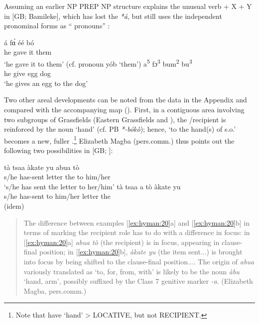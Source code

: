 \documentclass[output=paper]{langsci/langscibook}
\begin{document}
\noindent
Assuming an earlier NP PREP NP structure explains the unusual verb + X + Y  in  [GB; Bamileke], which has lost the  \textit{*á}, but still uses the independent pronominal forms as “ pronouns” \citep[22]{Voorhoeve1976}:

\ea
\label{ex:hyman:19}
\ea 
\gll á  {\downstep}f\'ɑ  é{\downstep}é  bó \\
he gave it them\\
\glt ‘he gave it to them’  (cf.  pronoun yób ‘them’)
\ex 
\gll  a\textsuperscript{5}  fɔ\textsuperscript{3}  bum\textsuperscript{2}  bu\textsuperscript{3}\\
he give  egg    dog\\
\glt ‘he gives an egg to the dog’  \citep[2]{Caroompas2014}
\z 
\z 

Two other areal developments can be noted from the data in the Appendix and compared with the accompanying map (). First, in a contiguous area involving two subgroups of Grassfields  (Eastern Grassfields and ), the /recipient  is reinforced by the noun ‘hand’ (cf. PB \textit{*-bókò}); hence, ‘to the hand(s) of s.o.’ becomes a new, fuller .\footnote{Note that \citet[166]{Heine2002} have ‘hand’ {\textgreater} LOCATIVE, but not RECIPIENT.} Elizabeth Magba (pers.comm.) thus points out the following two possibilities in  [GB; ]:
  
\ea
    \label{ex:hyman:20}
\ea 
\gll tà    tsaa   àkate  yu  abua  tò\\
s/he has-sent letter   the    to   him/her \\
\glt ‘s/he has sent the letter to her/him’ 
\ex 
\gll tà    tsaa     a  tò   àkate  yu \\
s/he has-sent  to him/her   letter   the\\
\glt (idem)
\z 
\z 

\begin{quote}
  The difference between examples [\ref{ex:hyman:20}a] and [\ref{ex:hyman:20}b] in terms of marking the recipient role has to do with a difference in focus: in [\ref{ex:hyman:20}a] \textit{abua tò} (the recipient) is in focus, appearing in clause-final position; in [\ref{ex:hyman:20}b], \textit{àkate yu} (the item sent...) is brought into focus by being shifted to the clause-final position.... The origin of \textit{abua} variously translated as ‘to, for, from, with’ is likely to be the noun \textit{àbu} ‘hand, arm’, possibly suffixed by the Class 7 genitive marker \textit{-a}. (Elizabeth Magba, pers.comm.)
\end{quote}
\end{document}
